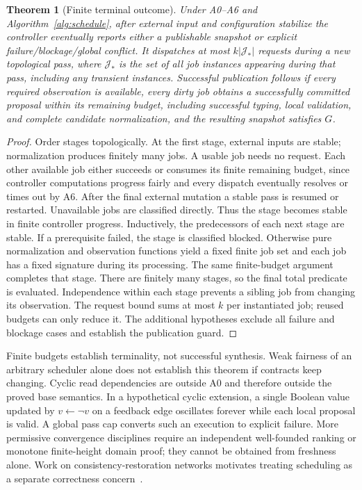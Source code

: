 \documentclass[pdflatex,sn-mathphys-num]{sn-jnl}
\theoremstyle{thmstyleone}
\newtheorem{theorem}{Theorem}
\theoremstyle{thmstylethree}
\theoremstyle{thmstyletwo}
\newcommand{\Jobs}{\mathcal J}
\begin{document}
\begin{theorem}[Finite terminal outcome]\label{thm:termination}
Under A0--A6 and Algorithm~\ref{alg:schedule}, after external input and configuration stabilize the controller eventually reports either a publishable snapshot or explicit failure/blockage/global conflict. It dispatches at most $k|\Jobs_*|$ requests during a new topological pass, where $\Jobs_*$ is the set of all job instances appearing during that pass, including any transient instances. Successful publication follows if every required observation is available, every dirty job obtains a successfully committed proposal within its remaining budget, including successful typing, local validation, and complete candidate normalization, and the resulting snapshot satisfies $G$.
\end{theorem}
\begin{proof}
Order stages topologically. At the first stage, external inputs are stable; normalization produces finitely many jobs. A usable job needs no request. Each other available job either succeeds or consumes its finite remaining budget, since controller computations progress fairly and every dispatch eventually resolves or times out by A6. After the final external mutation a stable pass is resumed or restarted. Unavailable jobs are classified directly. Thus the stage becomes stable in finite controller progress. Inductively, the predecessors of each next stage are stable. If a prerequisite failed, the stage is classified blocked. Otherwise pure normalization and observation functions yield a fixed finite job set and each job has a fixed signature during its processing. The same finite-budget argument completes that stage. There are finitely many stages, so the final total predicate is evaluated. Independence within each stage prevents a sibling job from changing its observation. The request bound sums at most $k$ per instantiated job; reused budgets can only reduce it. The additional hypotheses exclude all failure and blockage cases and establish the publication guard.\qedhere
\end{proof}

Finite budgets establish terminality, not successful synthesis. Weak fairness of an arbitrary scheduler alone does not establish this theorem if contracts keep changing. Cyclic read dependencies are outside A0 and therefore outside the proved base semantics. In a hypothetical cyclic extension, a single Boolean value updated by $v\gets\neg v$ on a feedback edge oscillates forever while each local proposal is valid. A global pass cap converts such an execution to explicit failure. More permissive convergence disciplines require an independent well-founded ranking or monotone finite-height domain proof; they cannot be obtained from freshness alone. Work on consistency-restoration networks motivates treating scheduling as a separate correctness concern~\cite{klare,stevens}.
\end{document}
